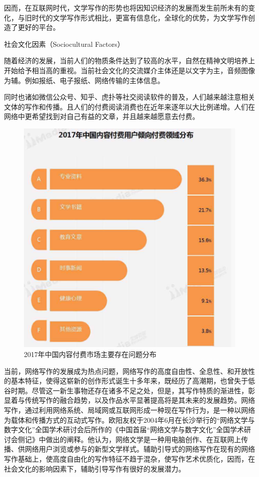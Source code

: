 \documentclass[10pt,letterpaper]{article}
\begin{document}
因而，在互联网时代，文学写作的形势也将因知识经济的发展而发生前所未有的变化，与旧时代的文学写作形式相比，更富有信息化，全球化的优势，为文学写作创造了更好的平台。

社会文化因素（Sociocultural Factors）

随着经济的发展，当前人们的物质条件达到了较高的水平，自然在精神文明培养上开始给予相当高的重视。当前社会文化的交流媒介主体还是以文字为主，音频图像为辅。例如报纸、电子报纸、网络传输的主体信息。

同时也诸如微信公众号、知乎、虎扑等社交阅读软件的普及，人们越来越注意相关文体的写作和传播。且人们的付费阅读消费也在近年来逐年以大比例递增。人们在网络中更希望找到对自己有益的文章，并且越来越愿意去付费。

\begin{figure}[H]
	\begin{center}
		\includegraphics[width=0.5\linewidth]{___16.png}
		\caption{2017年中国内容付费市场主要存在问题分布}
		\label{Fig:1}
	\end{center}
	\vspace{-0.5em}
\end{figure}

当前，网络写作的发展成为热点问题，网络写作的高度自由性、全息性、和开放性的基本特征，使得这崭新的创作形式诞生十多年来，既经历了高潮期，也曾失于低谷时期。尽管这一新生事物还存在诸多不足之处，但是，其写作特质的渐进性，彰显着与传统写作的融合趋势，以及作品水平显著提高将是其未来的发展趋势。网络写作，通过利用网络系统、局域网或互联网形成一种现在写作行为，是一种以网络为载体和传播方式的互动式写作。欧阳友权于2004年6月在长沙举行的“网络文学与数字文化”全国学术研讨会后所作的《中国首届“网络文学与数字文化”全国学术研讨会侧记》中做出的阐释。他认为，网络文学是一种用电脑创作、在互联网上传播、供网络用户浏览或参与的新型文学样式。辅助引导式的网络写作在现有的网络写作基础上，使高度自由化的写作特征不趋于混杂，使写作艺术优质化，因而，在社会文化的影响因素下，辅助引导写作有很好的发展潜力。
\end{document}
